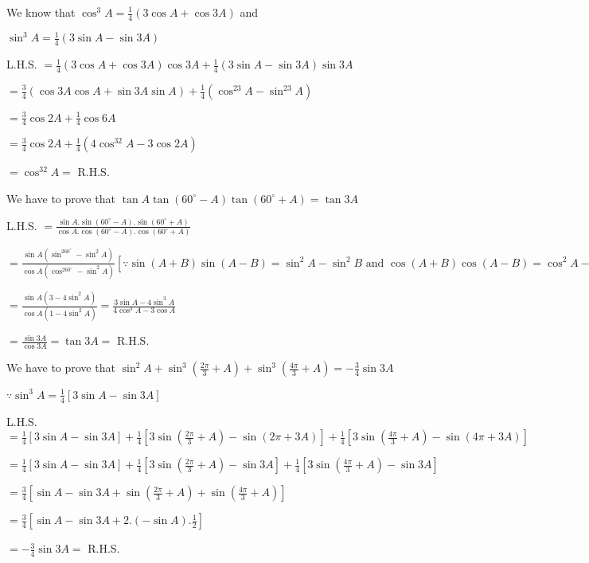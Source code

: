   We know that $\cos^3A = \frac{1}{4}(3\cos A + \cos 3A)$ and

  $\sin^3A = \frac{1}{4}(3\sin A - \sin 3A)$

  L.H.S. $= \frac{1}{4}(3\cos A + \cos 3A)\cos 3A + \frac{1}{4}(3\sin A - \sin 3A)\sin 3A$

  $= \frac{3}{4}(\cos3A\cos A + \sin 3A\sin A) + \frac{1}{4}(\cos^23A - \sin^23A)$

  $= \frac{3}{4}\cos 2A + \frac{1}{4}\cos6A$

  $= \frac{3}{4}\cos 2A + \frac{1}{4}(4\cos^32A - 3\cos 2A)$

  $= \cos^32A =$ R.H.S.

\item We have to prove that $\tan A\tan(60^\circ - A)\tan(60^\circ + A) = \tan 3A$

  L.H.S. $= \frac{\sin A.\sin(60^\circ - A).\sin(60^\circ + A)}{\cos A.\cos(60^\circ - A).\cos(60^\circ + A)}$

  $= \frac{\sin A(\sin^260^\circ - \sin^2A)}{\cos A(\cos^260^\circ - \sin^2A)}[\because \sin(A + B)\sin (A - B) = \sin^2A -
    \sin^2B\text{~and~}\cos(A + B)\cos(A - B) = \cos^2A - \sin^2B]$

  $= \frac{\sin A(3 - 4\sin^2A)}{\cos A(1 - 4\sin^2A)} = \frac{3\sin A - 4\sin^3A}{4\cos^3A - 3\cos A}$

  $= \frac{\sin 3A}{\cos 3A} = \tan 3A =$ R.H.S.

\item We have to prove that $\sin^2A + \sin^3\left(\frac{2\pi}{3} + A\right) + \sin^3\left(\frac{4\pi}{3} + A\right) =
  -\frac{3}{4}\sin 3A$

  $\because \sin^3A = \frac{1}{4}[3\sin A - \sin 3A]$

  L.H.S. $= \frac{1}{4}[3\sin A - \sin 3A] + \frac{1}{4}\left[3\sin\left(\frac{2\pi}{3} + A\right) - \sin(2\pi + 3A)\right]
  + \frac{1}{4}\left[3\sin\left(\frac{4\pi}{3} + A\right) - \sin(4\pi + 3A)\right]$

  $= \frac{1}{4}[3\sin A - \sin 3A] + \frac{1}{4}\left[3\sin\left(\frac{2\pi}{3} + A\right) - \sin3A\right]
  + \frac{1}{4}\left[3\sin\left(\frac{4\pi}{3} + A\right) - \sin3A\right]$

  $= \frac{3}{4}\left[\sin A - \sin 3A + \sin\left(\frac{2\pi}{3} + A\right) + \sin\left(\frac{4\pi}{3} + A\right)\right]$

  $= \frac{3}{4}[\sin A - \sin 3A + 2.(-\sin A).\frac{1}{2}]$

  $= -\frac{3}{4}\sin 3A =$ R.H.S.

